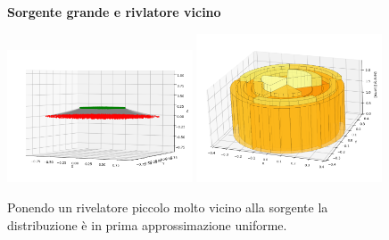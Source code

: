         \begin{figure}[ht]
            \textbf{Sorgente grande e rivlatore vicino}
            
            \centering
            \includegraphics[width=0.49\textwidth]{images/accettanza/example4.1.png}
            \includegraphics[width=0.49\textwidth]{images/accettanza/example4.2.png}
            \caption{Ponendo un rivelatore piccolo molto vicino alla sorgente la distribuzione è in prima approssimazione uniforme.}
        \end{figure}

        